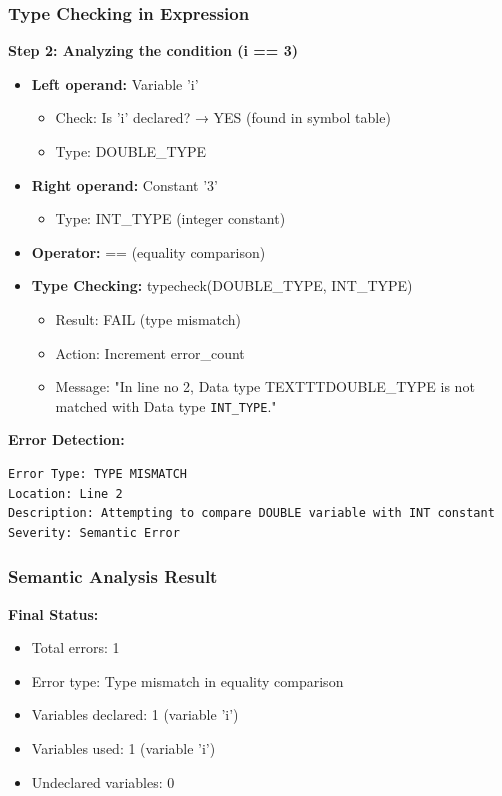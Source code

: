 \documentclass[12pt,a4paper]{article}
\begin{document}
\subsubsection{Type Checking in Expression}

\textbf{Step 2: Analyzing the condition (i == 3)}

\begin{itemize}
    \item \textbf{Left operand:} Variable 'i'
    \begin{itemize}
        \item Check: Is 'i' declared? → YES (found in symbol table)
        \item Type: DOUBLE\_TYPE
    \end{itemize}
    
    \item \textbf{Right operand:} Constant '3'
    \begin{itemize}
        \item Type: INT\_TYPE (integer constant)
    \end{itemize}
    
    \item \textbf{Operator:} == (equality comparison)
    
    \item \textbf{Type Checking:} typecheck(DOUBLE\_TYPE, INT\_TYPE)
    \begin{itemize}
        \item Result: FAIL (type mismatch)
        \item Action: Increment error\_count
        \item Message: "In line no 2, Data type TEXTTT{DOUBLE\_TYPE} is not matched with Data type \texttt{INT\_TYPE}."
    \end{itemize}
\end{itemize}

\textbf{Error Detection:}
\begin{verbatim}
Error Type: TYPE MISMATCH
Location: Line 2
Description: Attempting to compare DOUBLE variable with INT constant
Severity: Semantic Error
\end{verbatim}

\subsubsection{Semantic Analysis Result}

\textbf{Final Status:}

\begin{itemize}
    \item Total errors: 1
    \item Error type: Type mismatch in equality comparison
    \item Variables declared: 1 (variable 'i')
    \item Variables used: 1 (variable 'i')
    \item Undeclared variables: 0
\end{itemize}
\end{document}

